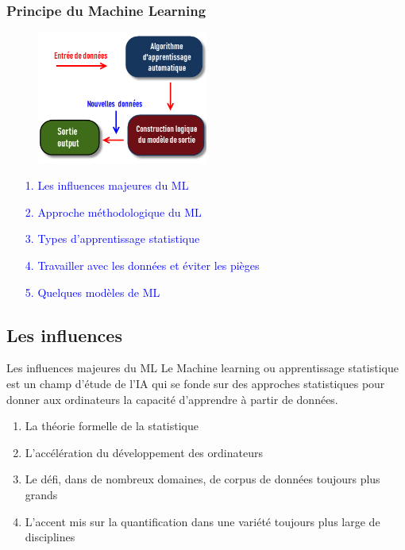 \documentclass{beamer}
\begin{document}
\begin{frame}
	\frametitle{Principe du Machine Learning}
	
	\begin{figure}
		\centering
		\includegraphics[width=0.5\textwidth]{ml-shema.png}
	\end{figure}
	
	\begin{enumerate}
		\item[\textcolor{blue}{1.}] \textcolor{blue}{Les influences majeures du ML}
		\item[\textcolor{blue}{2.}] \textcolor{blue}{Approche méthodologique du ML}
		\item[\textcolor{blue}{3.}] \textcolor{blue}{Types d'apprentissage statistique}
		\item[\textcolor{blue}{4.}] \textcolor{blue}{Travailler avec les données et éviter les pièges}
		\item[\textcolor{blue}{5.}] \textcolor{blue}{Quelques modèles de ML}
	\end{enumerate}
	
\end{frame}

\subsection{Les influences}
\begin{frame}{Les influences majeures du ML}
Le Machine learning ou apprentissage statistique est un champ d'étude de l'IA qui se fonde sur des approches statistiques pour donner aux ordinateurs la capacité d'apprendre à partir de données.\\


\begin{enumerate}
	\item La théorie formelle de la statistique
	\item L’accélération du développement des ordinateurs
	\item Le défi, dans de nombreux domaines, de corpus de données toujours plus grands
	\item L’accent mis sur la quantification dans une variété toujours plus large de disciplines
\end{enumerate}

\end{frame}
\end{document}
